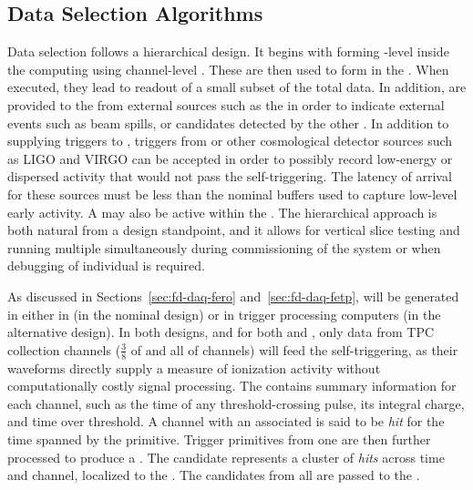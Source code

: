 

\subsection{Data Selection Algorithms}
\label{sec:fd-daq-sel}


Data selection follows a hierarchical design. 
It begins with forming -level 
inside the   computing using channel-level
. 
These are then used to form  
in the .
When executed, they lead to readout of a small subset of the total
data. 
In addition,  are provided to the
 from external sources such as the  in order to
indicate external events such as beam spills, or  candidates
detected by the other . 
In addition to supplying triggers to , triggers from
 or other cosmological detector sources such as LIGO and
VIRGO can be accepted in order to possibly record low-energy or
dispersed activity that would not pass the self-triggering. 
The latency of arrival for these sources must be less than the nominal
\snbpretime buffers used to capture low-level early 
activity.
A  may also be active within the . 
The hierarchical approach is both natural from a design standpoint, and 
it allows for vertical slice testing and running multiple
 simultaneously during commissioning of the system or
when debugging of individual  is required.

As discussed in Sections~\ref{sec:fd-daq-fero}
and~\ref{sec:fd-daq-fetp},  will be generated in
either in  (in the nominal design) or in trigger
processing computers (in the alternative design). 
In both designs, and for both  and 
, only data from TPC collection channels ($\frac{3}{8}$ of \single and all of \dual channels) will feed
the self-triggering, as their waveforms directly supply a measure of
ionization activity without computationally costly signal processing.
The  contains summary information for each
channel, such as the time of any threshold-crossing pulse, its
integral charge, and time over threshold. 
A channel with an associated  is said to be
\textit{hit} for the time spanned by the primitive. 
Trigger primitives from one  are then further processed
to produce a . 
The candidate represents a cluster of \textit{hits} across time and
channel, localized to the .
The candidates from all  are passed to the
.

